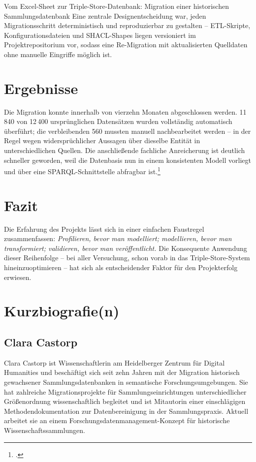 \begin{beitrag}{Vom Excel-Sheet zur Triple-Store-Datenbank: Migration einer historischen Sammlungsdatenbank}
Eine zentrale Designentscheidung war, jeden Migrationsschritt deterministisch und reproduzierbar zu gestalten -- ETL-Skripte, Konfigurationsdateien und SHACL-Shapes liegen versioniert im Projektrepositorium vor, sodass eine Re-Migration mit aktualisierten Quelldaten ohne manuelle Eingriffe möglich ist.

\section{Ergebnisse}
Die Migration konnte innerhalb von vierzehn Monaten abgeschlossen werden. 11\,840 von 12\,400 ursprünglichen Datensätzen wurden vollständig automatisch überführt; die verbleibenden 560 mussten manuell nachbearbeitet werden -- in der Regel wegen widersprüchlicher Aussagen über dieselbe Entität in unterschiedlichen Quellen. Die anschließende fachliche Anreicherung ist deutlich schneller geworden, weil die Datenbasis nun in einem konsistenten Modell vorliegt und über eine SPARQL-Schnittstelle abfragbar ist.\footcite[vgl.][63]{drechsler2025-erfahrungsbericht}

\section{Fazit}
Die Erfahrung des Projekts lässt sich in einer einfachen Faustregel zusammenfassen: \emph{Profilieren, bevor man modelliert; modellieren, bevor man transformiert; validieren, bevor man veröffentlicht.} Die Konsequente Anwendung dieser Reihenfolge -- bei aller Versuchung, schon vorab in das Triple-Store-System hineinzuoptimieren -- hat sich als entscheidender Faktor für den Projekterfolg erwiesen.

\end{beitrag}

\section*{Kurzbiografie(n)}

\subsection*{Clara Castorp}
Clara Castorp ist Wissenschaftlerin am Heidelberger Zentrum für Digital Humanities und beschäftigt sich seit zehn Jahren mit der Migration historisch gewachsener Sammlungsdatenbanken in semantische Forschungsumgebungen. Sie hat zahlreiche Migrationsprojekte für Sammlungseinrichtungen unterschiedlicher Größenordnung wissenschaftlich begleitet und ist Mitautorin einer einschlägigen Methodendokumentation zur Datenbereinigung in der Sammlungspraxis. Aktuell arbeitet sie an einem Forschungsdatenmanagement-Konzept für historische Wissenschaftssammlungen.

